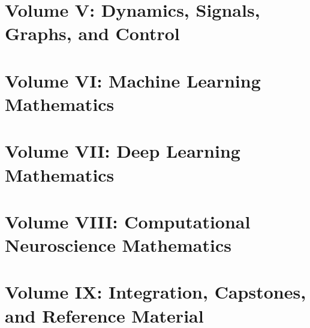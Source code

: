 \documentclass[11pt]{article}
\begin{document}
\part{Volume V: Dynamics, Signals, Graphs, and Control}






\part{Volume VI: Machine Learning Mathematics}






\part{Volume VII: Deep Learning Mathematics}






\part{Volume VIII: Computational Neuroscience Mathematics}










\part{Volume IX: Integration, Capstones, and Reference Material}



            
\end{document}
